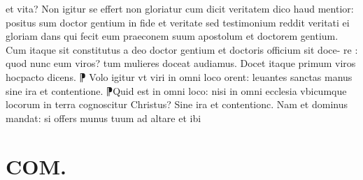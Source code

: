 \documentclass{article}
\begin{document}
\begin{pages}
et vita? Non igitur se effert non gloriatur cum dicit veritatem dico haud mentior: positus sum doctor gentium in fide et veritate  sed testimonium reddit veritati ei gloriam dans qui fecit eum praeconem suum apostolum  et doctorem gentium. Cum itaque sit constitutus a deo doctor gentium et doctoris officium sit doce- re : quod nunc eum viros? tum mulieres doceat audiamus. Docet itaque primum viros hocpacto   dicens. ⁋ Volo igitur vt viri in omni loco orent: leuantes sanctas manus sine ira et contentione. ⁋Quid est in omni loco: nisi in omni ecclesia vbicumque locorum in terra cognoscitur Christus? Sine ira et contentionc. Nam et dominus mandat: si offers munus tuum ad altare et ibi  \pend
\section*{COM. }

\end{pages}
\end{document}
